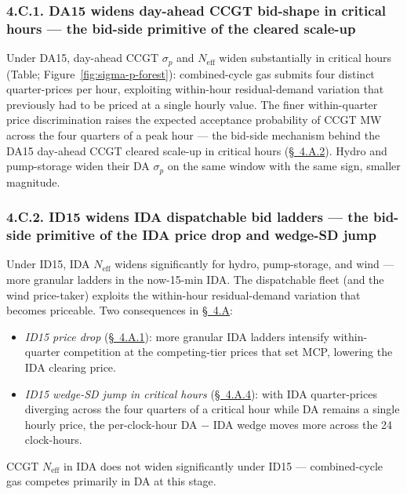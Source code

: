 \documentclass[11pt]{article}
\begin{document}
\subsubsection*{4.C.1. DA15 widens day-ahead CCGT bid-shape in critical hours --- the bid-side primitive of the cleared scale-up}\label{sec:4i}
Under DA15, day-ahead CCGT $\sigma_p$ and $N_{\text{eff}}$ widen substantially in critical hours (Table; Figure~\ref{fig:sigma-p-forest}): combined-cycle gas submits four distinct quarter-prices per hour, exploiting within-hour residual-demand variation that previously had to be priced at a single hourly value. The finer within-quarter price discrimination raises the expected acceptance probability of CCGT MW across the four quarters of a peak hour --- the bid-side mechanism behind the DA15 day-ahead CCGT cleared scale-up in critical hours (\hyperref[sec:4iii]{\S~4.A.2}). Hydro and pump-storage widen their DA $\sigma_p$ on the same window with the same sign, smaller magnitude.

\subsubsection*{4.C.2. ID15 widens IDA dispatchable bid ladders --- the bid-side primitive of the IDA price drop and wedge-SD jump}\label{sec:4-c-id15-ida}
Under ID15, IDA $N_{\text{eff}}$ widens significantly for hydro, pump-storage, and wind --- more granular ladders in the now-15-min IDA. The dispatchable fleet (and the wind price-taker) exploits the within-hour residual-demand variation that becomes priceable. Two consequences in \hyperref[sec:4-specA]{\S~4.A}:
\begin{itemize}\setlength{\itemsep}{1pt}
\item \emph{ID15 price drop} (\hyperref[sec:4ii]{\S~4.A.1}): more granular IDA ladders intensify within-quarter competition at the competing-tier prices that set MCP, lowering the IDA clearing price.
\item \emph{ID15 wedge-SD jump in critical hours} (\hyperref[sec:4-wedge]{\S~4.A.4}): with IDA quarter-prices diverging across the four quarters of a critical hour while DA remains a single hourly price, the per-clock-hour DA $-$ IDA wedge moves more across the 24 clock-hours.
\end{itemize}
CCGT $N_{\text{eff}}$ in IDA does not widen significantly under ID15 --- combined-cycle gas competes primarily in DA at this stage.
\end{document}
